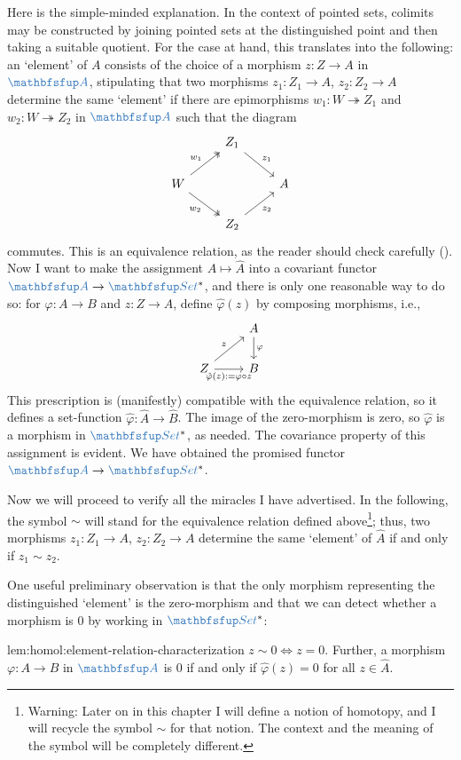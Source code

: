 Here is the simple-minded explanation. In the context of pointed sets,
colimits may be constructed by joining pointed sets at the
distinguished point and then taking a suitable quotient. For the case
at hand, this translates into the following: an `element' of $A$
consists of the choice of a morphism $z : Z \to A$ in $\categ{A}$,
stipulating that two morphisms $z_1 : Z_1 \to A$, $z_2 : Z_2 \to A$
determine the same `element' if there are epimorphisms
$w_1 : W \twoheadrightarrow Z_1$ and $w_2 : W \twoheadrightarrow Z_2$
in $\categ{A}$ such that the diagram
\[\begin{tikzcd}
    & Z_1 \arrow[dr, "z_1"] & \\
    W \arrow[ur, "w_1", two heads] \arrow[dr, "w_2"', two heads] & & A \\
    & Z_2 \arrow[ur, "z_2"'] &
  \end{tikzcd}\] commutes. This is an equivalence relation, as the
reader should check carefully
().  Now I
want to make the assignment $A \mapsto \hat{A}$ into a covariant
functor $\categ{A} \to \categ{Set}^*$, and there is only one
reasonable way to do so: for $\varphi : A \to B$ and $z : Z \to A$,
define $\hat{\varphi}(z)$ by composing morphisms, i.e.,
\[\begin{tikzcd}
    & A \arrow[d, "\varphi"] \\
    Z \arrow[ur, "z"] \arrow[r, "\hat{\varphi}(z) := \varphi \circ
    z"'] & B
  \end{tikzcd}\] This prescription is (manifestly) compatible with the
equivalence relation, so it defines a set-function
$\hat{\varphi} : \hat{A} \to \hat{B}$. The image of the zero-morphism
is zero, so $\hat{\varphi}$ is a morphism in $\categ{Set}^*$, as
needed. The covariance property of this assignment is evident. We have
obtained the promised functor $\categ{A} \to \categ{Set}^*$.

Now we will proceed to verify all the miracles I have advertised. In
the following, the symbol $\sim$ will stand for the equivalence
relation defined above\footnote{Warning: Later on in this chapter I
  will define a notion of homotopy, and I will recycle the symbol
  $\sim$ for that notion. The context and the meaning of the symbol
  will be completely different.}; thus, two morphisms
$z_1 : Z_1 \to A$, $z_2 : Z_2 \to A$ determine the same `element' of
$\hat{A}$ if and only if $z_1 \sim z_2$.

One useful preliminary observation is that the only morphism
representing the distinguished `element' is the zero-morphism and that
we can detect whether a morphism is $0$ by working in $\categ{Set}^*$:
\begin{lem}{}{lem:homol:element-relation-characterization}
  $z \sim 0 \iff z = 0$. Further, a morphism $\varphi : A \to B$ in
  $\categ{A}$ is $0$ if and only if $\hat{\varphi}(z) = 0$ for all
  $z \in \hat{A}$.
\end{lem}


